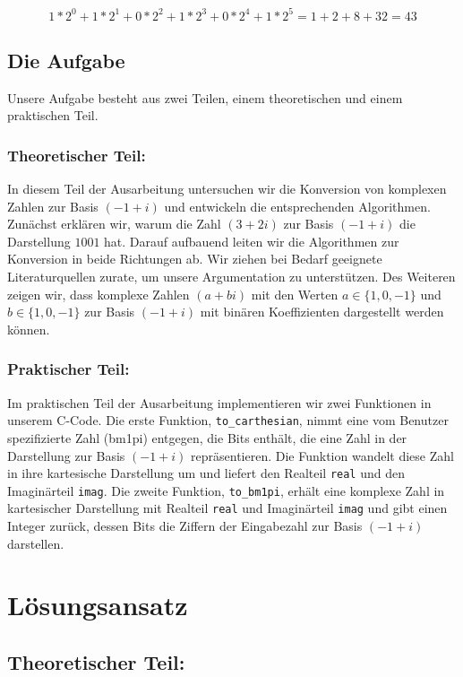 \documentclass[course=erap]{aspdoc}
\begin{document}
\[1* 2^0 + 1*2^1 + 0* 2^2 + 1* 2^3 + 0* 2^4 + 1* 2^5 = 1+2+8+32 = 43 \]
\newpage
\subsection{Die Aufgabe}

Unsere Aufgabe besteht aus zwei Teilen, einem theoretischen und einem praktischen Teil.

\subsubsection{Theoretischer Teil:}
In diesem Teil der Ausarbeitung untersuchen wir die Konversion von komplexen Zahlen zur Basis $(-1 + i)$ und entwickeln die entsprechenden Algorithmen. Zunächst erklären wir, warum die Zahl $(3 + 2i)$ zur Basis $(-1 + i)$ die Darstellung $1001$ hat. Darauf aufbauend leiten wir die Algorithmen zur Konversion in beide Richtungen ab. Wir ziehen bei Bedarf geeignete Literaturquellen zurate, um unsere Argumentation zu unterstützen. Des Weiteren zeigen wir, dass komplexe Zahlen $(a + bi)$ mit den Werten $a \in \{1, 0, -1\}$ und $b \in \{1, 0, -1\}$ zur Basis $(-1 + i)$ mit binären Koeffizienten dargestellt werden können.

\subsubsection{Praktischer Teil:}
Im praktischen Teil der Ausarbeitung implementieren wir zwei Funktionen in unserem C-Code. Die erste Funktion, \texttt{to\_carthesian}, nimmt eine vom Benutzer spezifizierte Zahl (bm1pi) entgegen, die Bits enthält, die eine Zahl in der Darstellung zur Basis $(-1 + i)$ repräsentieren. Die Funktion wandelt diese Zahl in ihre kartesische Darstellung um und liefert den Realteil \texttt{real} und den Imaginärteil \texttt{imag}. Die zweite Funktion, \texttt{to\_bm1pi}, erhält eine komplexe Zahl in kartesischer Darstellung mit Realteil \texttt{real} und Imaginärteil \texttt{imag} und gibt einen Integer zurück, dessen Bits die Ziffern der Eingabezahl zur Basis $(-1 + i)$ darstellen.

\section{Lösungsansatz}

\subsection{Theoretischer Teil:}
\end{document}
